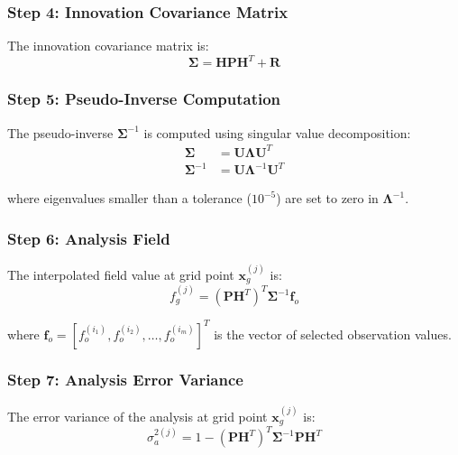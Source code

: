 \documentclass[11pt]{article}
\begin{document}
\subsubsection{Step 4: Innovation Covariance Matrix}

The innovation covariance matrix is:
\begin{equation}
\boldsymbol{\Sigma} = \mathbf{H}\mathbf{P}\mathbf{H}^T + \mathbf{R}
\end{equation}

\subsubsection{Step 5: Pseudo-Inverse Computation}

The pseudo-inverse $\boldsymbol{\Sigma}^{-1}$ is computed using singular value decomposition:
\begin{align}
\boldsymbol{\Sigma} &= \mathbf{U}\boldsymbol{\Lambda}\mathbf{U}^T \\
\boldsymbol{\Sigma}^{-1} &= \mathbf{U}\boldsymbol{\Lambda}^{-1}\mathbf{U}^T
\end{align}

where eigenvalues smaller than a tolerance ($10^{-5}$) are set to zero in $\boldsymbol{\Lambda}^{-1}$.

\subsubsection{Step 6: Analysis Field}

The interpolated field value at grid point $\mathbf{x}_g^{(j)}$ is:
\begin{equation}
f_g^{(j)} = (\mathbf{P}\mathbf{H}^T)^T \boldsymbol{\Sigma}^{-1} \mathbf{f}_o
\end{equation}

where $\mathbf{f}_o = [f_o^{(i_1)}, f_o^{(i_2)}, \ldots, f_o^{(i_m)}]^T$ is the vector of selected observation values.

\subsubsection{Step 7: Analysis Error Variance}

The error variance of the analysis at grid point $\mathbf{x}_g^{(j)}$ is:
\begin{equation}
\sigma_a^{2(j)} = 1 - (\mathbf{P}\mathbf{H}^T)^T \boldsymbol{\Sigma}^{-1} \mathbf{P}\mathbf{H}^T
\end{equation}
\end{document}
